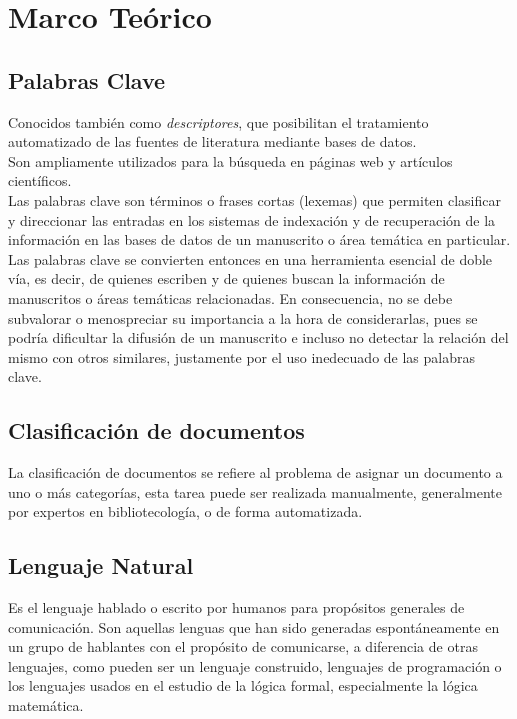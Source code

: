 \chapter{Marco Te\'orico}
\section{Palabras Clave}
Conocidos tambi\'en como \emph{descriptores}, que posibilitan el tratamiento
automatizado de las fuentes de literatura mediante bases de datos. \\

Son ampliamente utilizados para la b\'usqueda en p\'aginas web y art\'iculos
cient\'ificos. \\

Las palabras clave son t\'erminos o frases cortas (lexemas) que permiten clasificar
y direccionar las entradas en los sistemas de indexaci\'on y de recuperaci\'on de la
informaci\'on en las bases de datos de un manuscrito o \'area tem\'atica en
particular. Las palabras clave se convierten entonces en una herramienta esencial
de doble v\'ia, es decir, de quienes escriben y de quienes buscan la informaci\'on de
manuscritos o \'areas tem\'aticas relacionadas. En consecuencia, no se debe
subvalorar o menospreciar su importancia a la hora de considerarlas, pues se podr\'ia
dificultar la difusi\'on de un manuscrito e incluso no detectar la relaci\'on del
mismo con otros similares, justamente por el uso inedecuado de las palabras clave.

\section {Clasificaci\'on de documentos}
La clasificaci\'on de documentos se refiere al problema de asignar un documento a
uno o m\'as categor\'ias, esta tarea puede ser realizada manualmente, generalmente
por expertos en bibliotecolog\'ia, o de forma automatizada.

\section{Lenguaje Natural}
Es el lenguaje hablado o escrito por humanos para prop\'ositos generales
de comunicaci\'on. Son aquellas lenguas que han sido generadas
espont\'aneamente en un grupo de hablantes con el prop\'osito de
comunicarse, a diferencia de otras lenguajes, como pueden ser un lenguaje
construido, lenguajes de programaci\'on o los lenguajes usados en el
estudio de la l\'ogica formal, especialmente la l\'ogica matem\'atica.

